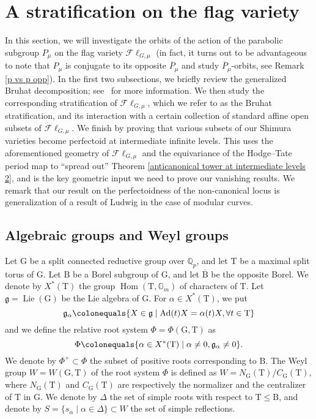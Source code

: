 \documentclass{amsart}
\theoremstyle{remark}
\numberwithin{equation}{subsection}
\newcommand{\Q}{\QQ}
\newcommand{\GG}{{\mathbb G}}
\newcommand{\QQ}{{\mathbb Q}}
\DeclareMathOperator{\Ad}{Ad}
\DeclareMathOperator{\Hom}{Hom}
\newcommand{\Fl}{\mathscr{F}\!\ell}
\newcommand{\ol}{\overline}
\DeclareMathOperator\Lie{Lie}
\newcommand{\defeq}{\colonequals}
\renewcommand{\(}{\left(}
\renewcommand{\)}{\right)}
\begin{document}
\section{A stratification on the flag variety}\label{stratifications}

In this section, we will investigate the orbits of the action of the parabolic subgroup $P_{\mu}$ on the flag
variety $\Fl_{G,\mu}$ (in fact, it turns out to be advantageous to note that $P_{\mu}$ is conjugate to its opposite $\ol{P}_{\mu}$ and study $\ol{P}_{\mu}$-orbits, see Remark \ref{p vs p opp}). In the first two subsections, we briefly review the generalized Bruhat decomposition; see~\cite[\S 5]{borel-tits} for more information. We then study the corresponding stratification of $\Fl_{G,\mu}$, which we refer to as the Bruhat stratification, and its interaction with a certain collection of standard affine open subsets of $\Fl_{G,\mu}$. We finish by proving that various subsets of our Shimura varieties become perfectoid at intermediate infinite levels. This uses the aforementioned geometry of $\Fl_{G,\mu}$ and the equivariance of the Hodge--Tate period map to ``spread out'' Theorem \ref{anticanonical tower at intermediate levels 2}, and is the key geometric input we need to prove our vanishing results. We remark that our result on the perfectoidness of the non-canonical locus is generalization of a result of Ludwig \cite{ludwig} in the case of modular curves.

\subsection{Algebraic groups and Weyl groups}\label{algebraic groups and weyl groups}
Let $\mathrm{G}$ be a split connected reductive group over $\Q_p$, and let $\mathrm{T}$ be a maximal split torus of $\mathrm{G}$.
Let $\mathrm{B}$ be a Borel subgroup of $\mathrm{G}$, and let $\ol{\mathrm{B}}$ be the opposite Borel. We denote by $X^*(\mathrm{T})$ the group $\Hom(\mathrm{T}, \GG_m)$ of characters of $\mathrm{T}$.  Let $\mathfrak{g}=\Lie(\mathrm{G})$ be the Lie algebra of $\mathrm{G}$. For $\alpha\in X^*(\mathrm{T})$, we put
$$
\mathfrak{g}_{\alpha}\defeq \{X\in \mathfrak{g} \mid  \Ad(t)X=\alpha(t)X,\forall t\in \mathrm{T}\}
$$
and we define the relative root system $\Phi=\Phi(\mathrm{G},\mathrm{T})$ as
$$
\Phi \defeq \{\alpha\in X^*(\mathrm{T}) \mid \alpha\neq 0, \mathfrak{g}_{\alpha}\neq 0\}.
$$
We denote by $\Phi^+\subset \Phi$ the subset of positive roots corresponding to $\mathrm{B}$. The Weyl group $W=W(\mathrm{G},\mathrm{T})$ of the root system $\Phi$ is defined as $W=N_{\mathrm{G}}(\mathrm{T})/C_{\mathrm{G}}(\mathrm{T})$, where $N_{\mathrm{G}}(\mathrm{T})$ and $C_{\mathrm{G}}(\mathrm{T})$ are respectively the normalizer and the centralizer of $\mathrm{T}$ in $\mathrm{G}$. We denote by $\Delta$ the set of simple roots with respect to $\mathrm{T} \leq \mathrm{B}$, and denote by $S=\{s_{\alpha} \mid \alpha\in \Delta\} \subset W$ the set of simple reflections.
\end{document}
